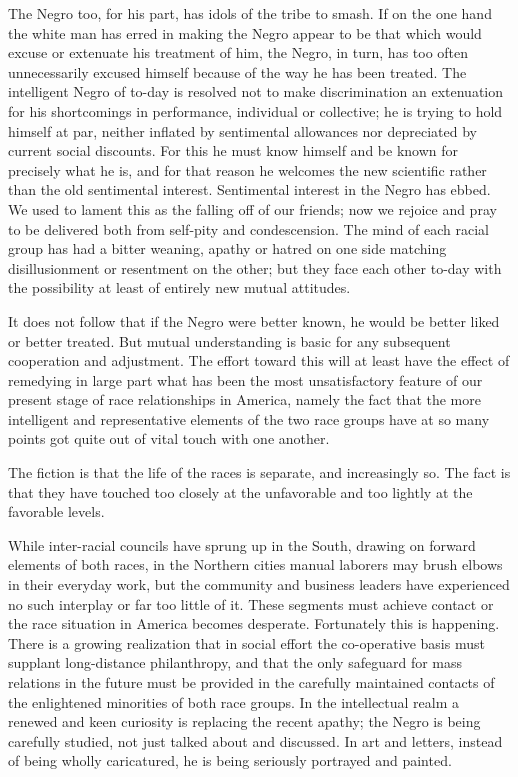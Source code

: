 \documentclass[12pt]{article}
\begin{document}
The Negro too, for his part, has idols of the tribe to smash. If on the one hand the white man has erred in making the Negro appear to be that which would excuse or extenuate his treatment of him, the Negro, in turn, has too often unnecessarily excused himself because of the way he has been treated. The intelligent Negro of to-day is resolved not to make discrimination an extenuation for his shortcomings in performance, individual or collective; he is trying to hold himself at par, neither inflated by sentimental allowances nor depreciated by current social discounts. For this he must know himself and be known for precisely what he is, and for that reason he welcomes the new scientific rather than the old sentimental interest. Sentimental interest in the Negro has ebbed. We used to lament this as the falling off of our friends; now we rejoice and pray to be delivered both from self-pity and condescension. The mind of each racial group has had a bitter weaning, apathy or hatred on one side matching disillusionment or resentment on the other; but they face each other to-day with the possibility at least of entirely new mutual attitudes.

It does not follow that if the Negro were better known, he would be better liked or better treated. But mutual understanding is basic for any subsequent cooperation and adjustment. The effort toward this will at least have the effect of remedying in large part what has been the most unsatisfactory feature of our present stage of race relationships in America, namely the fact that the more intelligent and representative elements of the two race groups have at so many points got quite out of vital touch with one another.

The fiction is that the life of the races is separate, and increasingly so. The fact is that they have touched too closely at the unfavorable and too lightly at the favorable levels.

While inter-racial councils have sprung up in the South, drawing on forward elements of both races, in the Northern cities manual laborers may brush elbows in their everyday work, but the community and business leaders have experienced no such interplay or far too little of it. These segments must achieve contact or the race situation in America becomes desperate. Fortunately this is happening. There is a growing realization that in social effort the co-operative basis must supplant long-distance philanthropy, and that the only safeguard for mass relations in the future must be provided in the carefully maintained contacts of the enlightened minorities of both race groups. In the intellectual realm a renewed and keen curiosity is replacing the recent apathy; the Negro is being carefully studied, not just talked about and discussed. In art and letters, instead of being wholly caricatured, he is being seriously portrayed and painted.
\end{document}
